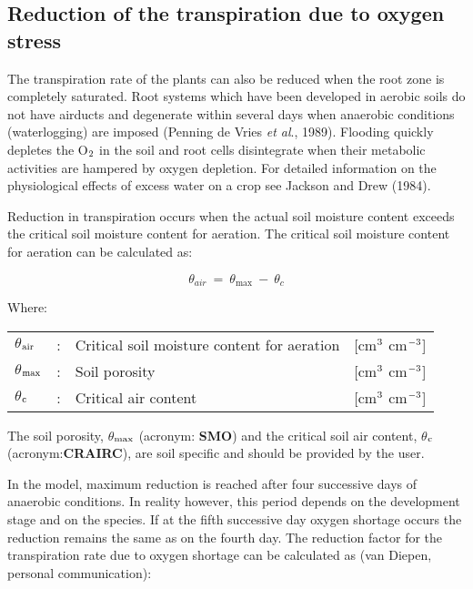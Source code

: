 \subsection{Reduction of the transpiration due to oxygen stress}
The transpiration rate of the plants can also be reduced when the root zone is completely
saturated. Root systems which have been developed in aerobic soils do not have airducts
and degenerate within several days when anaerobic conditions (waterlogging) are imposed
(Penning de Vries {\it et al}., 1989). Flooding quickly depletes the O$_{{\rm 2}}$ in the soil and root cells
disintegrate when their metabolic activities are hampered by oxygen depletion. For
detailed information on the physiological effects of excess water on a crop see Jackson
and Drew (1984).

Reduction in transpiration occurs when the actual soil moisture content exceeds the
critical soil moisture content for aeration. The critical soil moisture content for aeration
can be calculated as:

\begin{equation}
\label{eq:6.12}
\theta_{air} ~=~ \theta_{\max} ~-~\theta_{c} 
\end{equation}

Where:\\[5pt]
\begin{tabularx}{\textwidth}{llXr}
	$\theta$$_{{\rm air}}$ &:& Critical soil moisture content for aeration & [cm$^{{\rm 3}}$ cm$^{{\rm -3}}$]\\
	$\theta$$_{{\rm max}}$ &:& Soil porosity & [cm$^{{\rm 3}}$ cm$^{{\rm -3}}$]\\
	$\theta$$_{{\rm c}}$ &:& Critical air content & [cm$^{{\rm 3}}$ cm$^{{\rm -3}}$]\\
\end{tabularx}

The soil porosity, {\bf $\theta$$_{{\rm max}}$} (acronym: {\bf SMO}) and the critical soil air 
content, {\bf $\theta$$_{{\rm c}}$} (acronym:{\bf CRAIRC}), are soil specific and should 
be provided by the user. 

In the model, maximum reduction is reached after four successive days of anaerobic
conditions. In reality however, this period depends on the development stage and on the
species. If at the fifth successive day oxygen shortage occurs the reduction remains the
same as on the fourth day. The reduction factor for the transpiration rate due to oxygen
shortage can be calculated as (van Diepen, personal communication):

